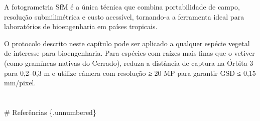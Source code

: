 \documentclass[
  portuguese,
  11pt,
  a4paper,
  open=any]{scrbook}
\begin{document}
A fotogrametria SfM é a única técnica que combina portabilidade de
campo, resolução submilimétrica e custo acessível, tornando-a a
ferramenta ideal para laboratórios de bioengenharia em países tropicais.

\begin{tcolorbox}[enhanced jigsaw, leftrule=.75mm, colframe=quarto-callout-tip-color-frame, colback=white, bottomrule=.15mm, opacityback=0, colbacktitle=quarto-callout-tip-color!10!white, breakable, bottomtitle=1mm, opacitybacktitle=0.6, title=\textcolor{quarto-callout-tip-color}{\faLightbulb}\hspace{0.5em}{Aplicação Prática}, titlerule=0mm, toprule=.15mm, toptitle=1mm, rightrule=.15mm, left=2mm, arc=.35mm, coltitle=black]

O protocolo descrito neste capítulo pode ser aplicado a qualquer espécie
vegetal de interesse para bioengenharia. Para espécies com raízes mais
finas que o vetiver (como gramíneas nativas do Cerrado), reduza a
distância de captura na Órbita 3 para 0,2--0,3 m e utilize câmera com
resolução ≥ 20 MP para garantir GSD ≤ 0,15 mm/pixel.

\end{tcolorbox}


\chapter{}\label{section-1}

\# Referências \{.unnumbered\}
\end{document}
